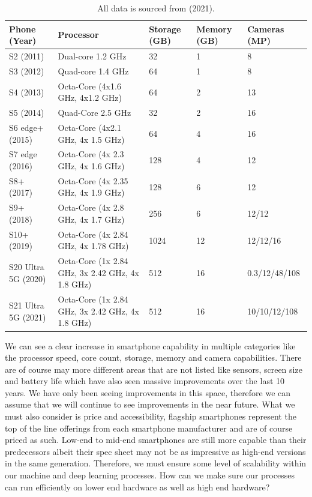 \documentclass{article}
\begin{document}
\begin{table}[h!]
    \centering
    \begin{tabular}{ |m{2.5cm}|m{2.7cm}|m{1cm}|m{1.2cm}|m{2.5cm}| }
        \hline
        Phone (Year) & Processor & Storage (GB) & Memory (GB) & Cameras (MP) \\
        \hline
        \hline
        S2 (2011) & Dual-core 1.2 GHz & 32 & 1 & 8 \\
        \hline
        S3 (2012) & Quad-core 1.4 GHz & 64 & 1 & 8 \\
        \hline
        S4 (2013) & Octa-Core (4x1.6 GHz, 4x1.2 GHz) & 64 & 2 & 13 \\
        \hline
        S5 (2014) & Quad-Core 2.5 GHz & 32 & 2 & 16 \\
        \hline
        S6 edge+ (2015) & Octa-Core (4x2.1 GHz, 4x 1.5 GHz) & 64 & 4 & 16 \\
        \hline
        S7 edge (2016) & Octa-Core (4x 2.3 GHz, 4x 1.6 GHz) & 128 &	4 &	12 \\
        \hline
        S8+ (2017) & Octa-Core (4x 2.35 GHz, 4x 1.9 GHz) & 128 & 6 & 12 \\
        \hline
        S9+ (2018) & Octa-Core (4x 2.8 GHz, 4x 1.7 GHz) & 256 &	6 &	12/12 \\
        \hline
        S10+ (2019) & Octa-Core (4x 2.84 GHz, 4x 1.78 GHz) & 1024 &	12 & 12/12/16 \\
        \hline
        S20 Ultra 5G (2020) & Octa-Core (1x 2.84 GHz, 3x 2.42 GHz, 4x 1.8 GHz) & 512 & 16 & 0.3/12/48/108 \\
        \hline
        S21 Ultra 5G (2021) & Octa-Core (1x 2.84 GHz, 3x 2.42 GHz, 4x 1.8 GHz) & 512 & 16 &	10/10/12/108 \\
        \hline
    \end{tabular}
    \caption{All data is sourced from \citeauthor{gsm} (2021).}
    \label{table:1}
\end{table}
\break
\clearpage

\par

We can see a clear increase in smartphone capability in multiple categories like the processor speed, core count, 
storage, memory and camera capabilities. There are of course may more different areas that are not listed like sensors, 
screen size and battery life which have also seen massive improvements over the last 10 years. We have only been seeing 
improvements in this space, therefore we can assume that we will continue to see improvements in the near future. 
What we must also consider is price and accessibility, flagship smartphones represent the top of the line offerings from
each smartphone manufacturer and are of course priced as such. Low-end to mid-end smartphones are still more capable 
than their predecessors albeit their spec sheet may not be as impressive as high-end versions in the same generation. 
Therefore, we must ensure some level of scalability within our machine and deep learning processes. How can we make 
sure our processes can run efficiently on lower end hardware as well as high end hardware?
\end{document}

